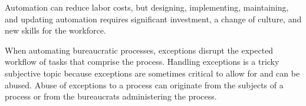 

Automation can reduce labor costs, but designing, implementing, maintaining, and updating automation requires significant investment, a change of culture, and new skills for the workforce.  


When automating bureaucratic processes, exceptions disrupt the expected workflow of tasks that comprise the process. Handling exceptions is a tricky subjective topic because exceptions are sometimes critical to allow for and can be abused. Abuse of exceptions to a process can originate from the subjects of a process or from the bureaucrats administering the process.